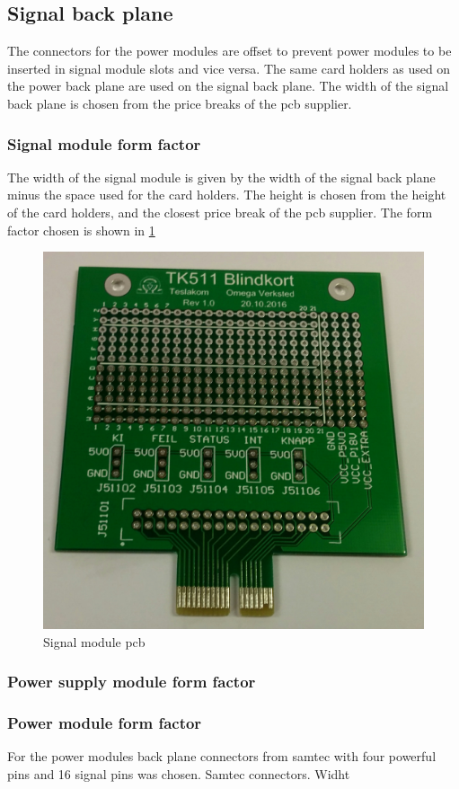 \subsection{Signal back plane}
The connectors for the power modules are offset to prevent power modules to be inserted in signal module slots and vice versa. The same card holders as used on the power back plane are used on the signal back plane. The width of the signal back plane is chosen from the price breaks of the pcb supplier.


\subsubsection{Signal module form factor}
The width of the signal module is given by the width of the signal back plane minus the space used for the card holders. The height is chosen from the height of the card holders, and the closest price break of the pcb supplier. The form factor chosen is shown in \cref{fig:tk511_img}
\begin{figure}
    \centering
    \includegraphics{img/TK511_Blindkort.jpg}
    \caption{Signal module pcb}
    \label{fig:tk511_img}
\end{figure}

\subsubsection{Power supply module form factor}

\subsubsection{Power module form factor}
For the power modules back plane connectors from samtec with four powerful pins and 16 signal pins was chosen.
Samtec connectors.
Widht